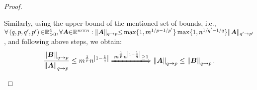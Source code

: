 \begin{proof}
\begin{itemize}
Similarly, using the upper-bound of the mentioned set of bounds, i.e., $\forall \left( q , p , q' , p' \right) {\in} \mathbb{R}^4_{>0} , \forall \boldsymbol{A} {\in} \mathbb{R}^{m {\times} n} : \Vert \boldsymbol{A} \Vert_{q \to p} {\leq} \max \{1 , m^{1/p {-} 1/{p'}} \} \max \{1 , n^{1/{q'} {-} 1/q} \} \Vert \boldsymbol{A} \Vert_{q' \to p'}$, and following above steps, we obtain:
\begin{gather*}
\begin{aligned}
\frac{\mynorm{\boldsymbol{B}}_{q \to p}}{\mynorm{\boldsymbol{A}}_{q \to p}} \leq m^{\frac1p} n^{\myabs{1 - \frac1q}} \xLongrightarrow{m^{\frac1p} n^{\myabs{1 - \frac1q}} \geq 1} \mynorm{\boldsymbol{A}}_{q \to p} \leq \mynorm{\boldsymbol{B}}_{q \to p}.
\end{aligned}
\end{gather*}
\end{itemize}
\end{proof}
